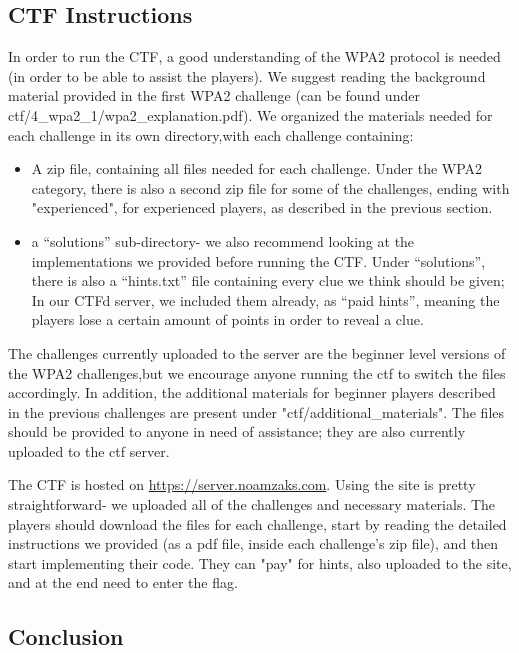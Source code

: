 \documentclass[sigconf]{acmart}
\begin{document}
\subsection{CTF Instructions}

In order to run the CTF, a good understanding of the WPA2 protocol is needed (in order to be able to assist the players). We suggest reading the background material provided in the first WPA2 challenge (can be found under ctf/4\_wpa2\_1/wpa2\_explanation.pdf).
We organized the materials needed for each challenge in its own directory,with each challenge containing:
\begin{itemize}
\item A zip file, containing all files needed for each challenge. Under the WPA2 category, there is also a second zip file for some of the challenges, ending with "experienced", for experienced players, as described in the previous section.
\item a “solutions” sub-directory- we also recommend looking at the implementations we provided before running the CTF. Under “solutions”, there is also a “hints.txt” file containing every clue we think should be given; In our CTFd server, we included them already, as “paid hints”, meaning the players lose a certain amount of points in order to reveal a clue.
\end{itemize}

The challenges currently uploaded to the server are the beginner level versions of the WPA2 challenges,but we encourage anyone running the ctf to switch the files accordingly.
In addition, the additional materials for beginner players described in the previous challenges are present under "ctf/additional\_materials". The files should be provided to anyone in need of assistance; they are also currently uploaded to the ctf server.

The CTF is hosted on \hyperlink{https://server.noamzaks.com}{https://server.noamzaks.com}.
Using the site is pretty straightforward- we uploaded all of the challenges and necessary materials. The players should download the files for each challenge, start by reading the detailed instructions we provided (as a pdf file, inside each challenge's zip file), and then start implementing their code. They can "pay" for hints, also uploaded to the site, and at the end need to enter the flag.


\subsection{Conclusion}
\end{document}
